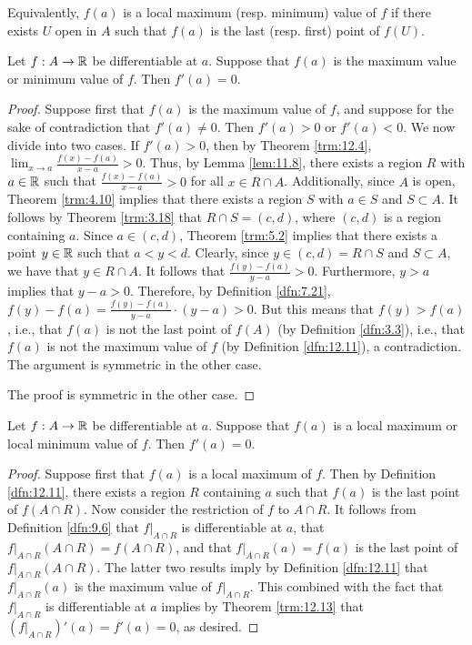 \documentclass[../main.tex]{subfiles}
\begin{document}
\begin{remark}\label{rmk:12.12}
    Equivalently, $f(a)$ is a local maximum (resp. minimum) value of $f$ if there exists $U$ open in $A$ such that $f(a)$ is the last (resp. first) point of $f(U)$.
\end{remark}

\begin{theorem}\label{trm:12.13}
    Let $f:A\to\mathbb{R}$ be differentiable at $a$. Suppose that $f(a)$ is the maximum value or minimum value of $f$. Then $f'(a)=0$.
    \begin{proof}
        Suppose first that $f(a)$ is the maximum value of $f$, and suppose for the sake of contradiction that $f'(a)\neq 0$. Then $f'(a)>0$ or $f'(a)<0$. We now divide into two cases. If $f'(a)>0$, then by Theorem \ref{trm:12.4}, $\lim_{x\to a}\frac{f(x)-f(a)}{x-a}>0$. Thus, by Lemma \ref{lem:11.8}, there exists a region $R$ with $a\in\mathbb{R}$ such that $\frac{f(x)-f(a)}{x-a}>0$ for all $x\in R\cap A$. Additionally, since $A$ is open, Theorem \ref{trm:4.10} implies that there exists a region $S$ with $a\in S$ and $S\subset A$. It follows by Theorem \ref{trm:3.18} that $R\cap S=(c,d)$, where $(c,d)$ is a region containing $a$. Since $a\in(c,d)$, Theorem \ref{trm:5.2} implies that there exists a point $y\in\mathbb{R}$ such that $a<y<d$. Clearly, since $y\in(c,d)=R\cap S$ and $S\subset A$, we have that $y\in R\cap A$. It follows that $\frac{f(y)-f(a)}{y-a}>0$. Furthermore, $y>a$ implies that $y-a>0$. Therefore, by Definition \ref{dfn:7.21}, $f(y)-f(a)=\frac{f(y)-f(a)}{y-a}\cdot(y-a)>0$. But this means that $f(y)>f(a)$, i.e., that $f(a)$ is not the last point of $f(A)$ (by Definition \ref{dfn:3.3}), i.e., that $f(a)$ is not the maximum value of $f$ (by Definition \ref{dfn:12.11}), a contradiction. The argument is symmetric in the other case.\par
        The proof is symmetric in the other case.
    \end{proof}
\end{theorem}

\begin{corollary}\label{cly:12.14}
    Let $f:A\to\mathbb{R}$ be differentiable at $a$. Suppose that $f(a)$ is a local maximum or local minimum value of $f$. Then $f'(a)=0$.
    \begin{proof}
        Suppose first that $f(a)$ is a local maximum of $f$. Then by Definition \ref{dfn:12.11}, there exists a region $R$ containing $a$ such that $f(a)$ is the last point of $f(A\cap R)$. Now consider the restriction of $f$ to $A\cap R$. It follows from Definition \ref{dfn:9.6} that $f|_{A\cap R}$ is differentiable at $a$, that $f|_{A\cap R}(A\cap R)=f(A\cap R)$, and that $f|_{A\cap R}(a)=f(a)$ is the last point of $f|_{A\cap R}(A\cap R)$. The latter two results imply by Definition \ref{dfn:12.11} that $f|_{A\cap R}(a)$ is the maximum value of $f|_{A\cap R}$. This combined with the fact that $f|_{A\cap R}$ is differentiable at $a$ implies by Theorem \ref{trm:12.13} that $(f|_{A\cap R})'(a)=f'(a)=0$, as desired.
    \end{proof}
\end{corollary}
\end{document}
